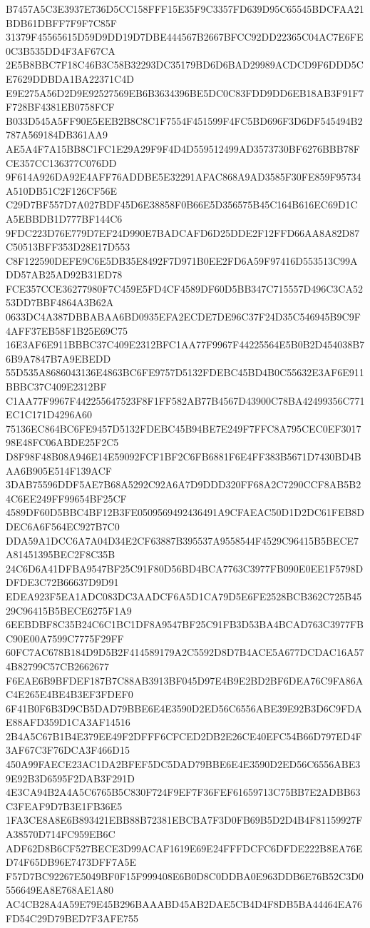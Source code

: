 {{B7457A5C3E3937E736D5CC158FFF15E35F9C3357FD639D95C65545BDCFAA21BDB61DBFF7F9F7C85F
31379F45565615D59D9DD19D7DBE444567B2667BFCC92DD22365C04AC7E6FE0C3B535DD4F3AF67CA
2E5B8BBC7F18C46B3C58B32293DC35179BD6D6BAD29989ACDCD9F6DDD5CE7629DDBDA1BA22371C4D
E9E275A56D2D9E92527569EB6B3634396BE5DC0C83FDD9DD6EB18AB3F91F7F728BF4381EB0758FCF
B033D545A5FF90E5EEB2B8C8C1F7554F451599F4FC5BD696F3D6DF545494B2787A569184DB361AA9
AE5A4F7A15BB8C1FC1E29A29F9F4D4D559512499AD3573730BF6276BBB78FCE357CC136377C076DD
9F614A926DA92E4AFF76ADDBE5E32291AFAC868A9AD3585F30FE859F95734A510DB51C2F126CF56E
C29D7BF557D7A027BDF45D6E38858F0B66E5D356575B45C164B616EC69D1CA5EBBDB1D777BF144C6
9FDC223D76E779D7EF24D990E7BADCAFD6D25DDE2F12FFD66AA8A82D87C50513BFF353D28E17D553
C8F122590DEFE9C6E5DB35E8492F7D971B0EE2FD6A59F97416D553513C99ADD57AB25AD92B31ED78
FCE357CCE36277980F7C459E5FD4CF4589DF60D5BB347C715557D496C3CA5253DD7BBF4864A3B62A
0633DC4A387DBBABAA6BD0935EFA2ECDE7DE96C37F24D35C546945B9C9F4AFF37EB58F1B25E69C75
16E3AF6E911BBBC37C409E2312BFC1AA77F9967F44225564E5B0B2D454038B76B9A7847B7A9EBEDD
55D535A8686043136E4863BC6FE9757D5132FDEBC45BD4B0C55632E3AF6E911BBBC37C409E2312BF
C1AA77F9967F442255647523F8F1FF582AB77B4567D43900C78BA42499356C771EC1C171D4296A60
75136EC864BC6FE9457D5132FDEBC45B94BE7E249F7FFC8A795CEC0EF301798E48FC06ABDE25F2C5
D8F98F48B08A946E14E59092FCF1BF2C6FB6881F6E4FF383B5671D7430BD4BAA6B905E514F139ACF
3DAB75596DDF5AE7B68A5292C92A6A7D9DDD320FF68A2C7290CCF8AB5B24C6EE249FF99654BF25CF
4589DF60D5BBC4BF12B3FE0509569492436491A9CFAEAC50D1D2DC61FEB8DDEC6A6F564EC927B7C0
DDA59A1DCC6A7A04D34E2CF63887B395537A9558544F4529C96415B5BECE7A81451395BEC2F8C35B
24C6D6A41DFBA9547BF25C91F80D56BD4BCA7763C3977FB090E0EE1F5798DDFDE3C72B66637D9D91
EDEA923F5EA1ADC083DC3AADCF6A5D1CA79D5E6FE2528BCB362C725B4529C96415B5BECE6275F1A9
6EEBDBF8C35B24C6C1BC1DF8A9547BF25C91FB3D53BA4BCAD763C3977FBC90E00A7599C7775F29FF
60FC7AC678B184D9D5B2F414589179A2C5592D8D7B4ACE5A677DCDAC16A574B82799C57CB2662677
F6EAE6B9BFDEF187B7C88AB3913BF045D97E4B9E2BD2BF6DEA76C9FA86AC4E265E4BE4B3EF3FDEF0
6F41B0F6B3D9CB5DAD79BBE6E4E3590D2ED56C6556ABE39E92B3D6C9FDAE88AFD359D1CA3AF14516
2B4A5C67B1B4E379EE49F2DFFF6CFCED2DB2E26CE40EFC54B66D797ED4F3AF67C3F76DCA3F466D15
450A99FAECE23AC1DA2BFEF5DC5DAD79BBE6E4E3590D2ED56C6556ABE39E92B3D6595F2DAB3F291D
4E3CA94B2A4A5C6765B5C830F724F9EF7F36FEF61659713C75BB7E2ADBB63C3FEAF9D7B3E1FB36E5
1FA3CE8A8E6B893421EBB88B72381EBCBA7F3D0FB69B5D2D4B4F81159927FA38570D714FC959EB6C
ADF62D8B6CF527BECE3D99ACAF1619E69E24FFFDCFC6DFDE222B8EA76ED74F65DB96E7473DFF7A5E
F57D7BC92267E5049BF0F15F999408E6B0D8C0DDBA0E963DDB6E76B52C3D0556649EA8E768AE1A80
AC4CB28A4A59E79E45B296BAAABD45AB2DAE5CB4D4F8DB5BA44464EA76FD54C29D79BED7F3AFE755
}}
